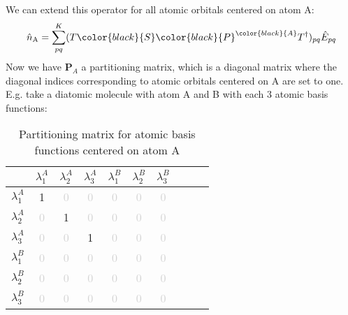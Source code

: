   We can extend this operator for all atomic orbitals centered on atom A:
  \begin{equation}
     \hat{n}_\text{A} = \sum^K_{pq} (T {\color{black}{S}} {\color{black}{P}}^{\color{black}{A}} T^\dagger)_{pq} \hat{E}_{pq}
  \end{equation}
  Now we have $\textbf{P}_A$ a partitioning matrix, which is a diagonal matrix where the diagonal indices corresponding to atomic orbitals centered on A are set to one. E.g. take a diatomic molecule with atom A and B with each 3 atomic basis functions:


  \begin{table}[H]
  \centering
  \captionsetup{justification=centering,margin=2cm}

  \begin{tabular}{|c||c|c|c|c|c|c|c|c|c|}
  \hline
   & $\lambda^{A}_1$ & $\lambda^{A}_2$  &  $\lambda^{A}_3$ &  $\lambda^{B}_1$ & $\lambda^{B}_2$  &  $\lambda^{B}_3$ \\ \hline \hline
  $\lambda^{A}_1$ & 1 & \textcolor{lightgray}{0} & \textcolor{lightgray}{0} & \textcolor{lightgray}{0} & \textcolor{lightgray}{0} & \textcolor{lightgray}{0} \\ \hline
  $\lambda^{A}_2$ & \textcolor{lightgray}{0} & 1 & \textcolor{lightgray}{0} & \textcolor{lightgray}{0} & \textcolor{lightgray}{0} & \textcolor{lightgray}{0} \\ \hline
  $\lambda^{A}_3$ & \textcolor{lightgray}{0} & \textcolor{lightgray}{0} & 1 & \textcolor{lightgray}{0} & \textcolor{lightgray}{0} & \textcolor{lightgray}{0} \\ \hline
  $\lambda^{B}_1$ & \textcolor{lightgray}{0} & \textcolor{lightgray}{0} & \textcolor{lightgray}{0} & \textcolor{lightgray}{0} & \textcolor{lightgray}{0} & \textcolor{lightgray}{0} \\ \hline
  $\lambda^{B}_2$ & \textcolor{lightgray}{0} & \textcolor{lightgray}{0} & \textcolor{lightgray}{0} & \textcolor{lightgray}{0} & \textcolor{lightgray}{0} & \textcolor{lightgray}{0} \\ \hline
  $\lambda^{B}_3$ & \textcolor{lightgray}{0} & \textcolor{lightgray}{0} & \textcolor{lightgray}{0} & \textcolor{lightgray}{0} & \textcolor{lightgray}{0} & \textcolor{lightgray}{0} \\ \hline

  \end{tabular}
  \caption {Partitioning matrix for atomic basis functions centered on atom A}

  \end{table}
